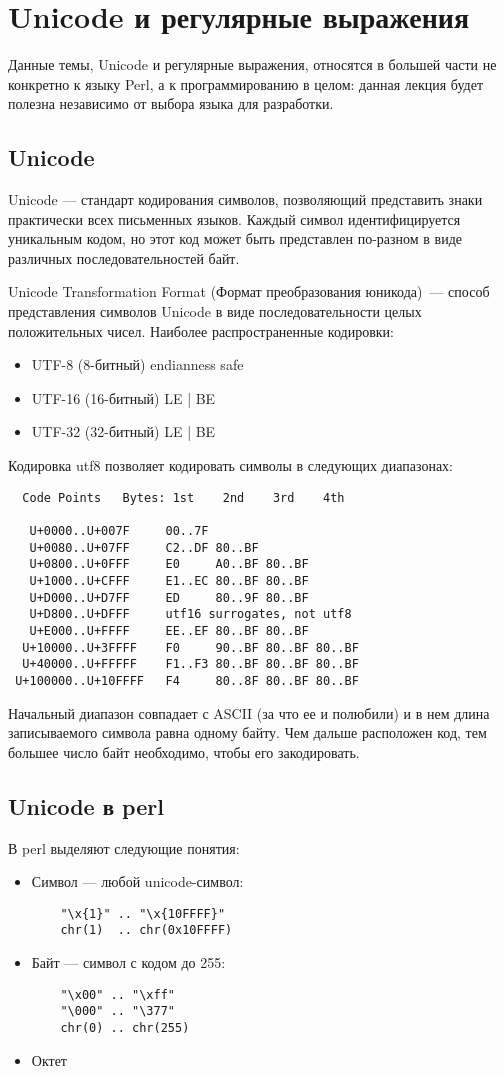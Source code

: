 \setcounter{chapter}{3}
\chapter{Unicode и регулярные выражения}
Данные темы, Unicode и регулярные выражения, относятся в большей части не конкретно к языку Perl, а к программированию в целом: данная лекция будет полезна независимо от выбора языка для разработки.

\section{Unicode} %
Unicode --- стандарт кодирования символов, позволяющий представить знаки практически всех письменных языков. Каждый символ идентифицируется уникальным кодом, но этот код может быть представлен по-разном в виде различных последовательностей байт.

Unicode Transformation Format (Формат преобразования юникода)~--- способ представления символов Unicode в виде последовательности целых положительных чисел. Наиболее распространенные кодировки:
\begin{itemize}
  \item UTF-8 (8-битный) endianness safe
  \item UTF-16 (16-битный) LE | BE
  \item UTF-32 (32-битный) LE | BE
\end{itemize}
Кодировка utf8 позволяет кодировать символы в следующих диапазонах:
\begin{verbatim}
  Code Points   Bytes: 1st    2nd    3rd    4th

   U+0000..U+007F     00..7F
   U+0080..U+07FF     C2..DF 80..BF
   U+0800..U+0FFF     E0     A0..BF 80..BF
   U+1000..U+CFFF     E1..EC 80..BF 80..BF
   U+D000..U+D7FF     ED     80..9F 80..BF
   U+D800..U+DFFF     utf16 surrogates, not utf8
   U+E000..U+FFFF     EE..EF 80..BF 80..BF
  U+10000..U+3FFFF    F0     90..BF 80..BF 80..BF
  U+40000..U+FFFFF    F1..F3 80..BF 80..BF 80..BF
 U+100000..U+10FFFF   F4     80..8F 80..BF 80..BF
\end{verbatim}
Начальный диапазон совпадает с ASCII (за что ее и полюбили) и в нем длина записываемого символа равна одному байту. Чем дальше расположен код, тем большее число байт необходимо, чтобы его закодировать.

\section{Unicode в perl}  %
В perl выделяют следующие понятия:
\begin{itemize}
  \item Символ --- любой unicode-символ:
  \begin{verbatim}
    "\x{1}" .. "\x{10FFFF}"
    chr(1)  .. chr(0x10FFFF)
  \end{verbatim}
  \item Байт --- символ с кодом до 255:
  \begin{verbatim}
    "\x00" .. "\xff"
    "\000" .. "\377"
    chr(0) .. chr(255)
  \end{verbatim}
  \item Октет
\end{itemize}

